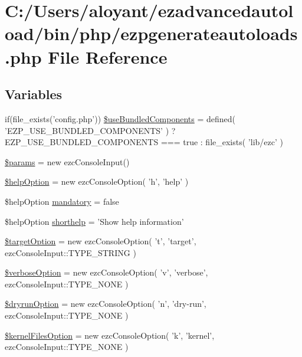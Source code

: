 \hypertarget{ezpgenerateautoloads_8php}{\section{C\-:/\-Users/aloyant/ezadvancedautoload/bin/php/ezpgenerateautoloads.php File Reference}
\label{ezpgenerateautoloads_8php}
}
\subsection*{Variables}
\begin{DoxyCompactItemize}
\item 
if(file\-\_\-exists('config.\-php')) \hyperlink{ezpgenerateautoloads_8php_abdb1c04b56bd870d8c95d438c1a3ceb7}{\$use\-Bundled\-Components} = defined( 'E\-Z\-P\-\_\-\-U\-S\-E\-\_\-\-B\-U\-N\-D\-L\-E\-D\-\_\-\-C\-O\-M\-P\-O\-N\-E\-N\-T\-S' ) ? E\-Z\-P\-\_\-\-U\-S\-E\-\_\-\-B\-U\-N\-D\-L\-E\-D\-\_\-\-C\-O\-M\-P\-O\-N\-E\-N\-T\-S === true \-: file\-\_\-exists( 'lib/ezc' )
\item 
\hyperlink{ezpgenerateautoloads_8php_afe68e6fbe7acfbffc0af0c84a1996466}{\$params} = new ezc\-Console\-Input()
\item 
\hyperlink{ezpgenerateautoloads_8php_a785ce4531ef75b21040c99c8cbce7aa4}{\$help\-Option} = new ezc\-Console\-Option( 'h', 'help' )
\item 
\$help\-Option \hyperlink{ezpgenerateautoloads_8php_ac38115d855b4d48735ec865ab62bf1fe}{mandatory} = false
\item 
\$help\-Option \hyperlink{ezpgenerateautoloads_8php_a6878132bff242d248a03a92df0ead036}{shorthelp} = 'Show help information'
\item 
\hyperlink{ezpgenerateautoloads_8php_a6b7b596c6eccab7f3c39bbcad2d711a0}{\$target\-Option} = new ezc\-Console\-Option( 't', 'target', ezc\-Console\-Input\-::\-T\-Y\-P\-E\-\_\-\-S\-T\-R\-I\-N\-G )
\item 
\hyperlink{ezpgenerateautoloads_8php_a22133d0c8998aa2d18623686cca5faa4}{\$verbose\-Option} = new ezc\-Console\-Option( 'v', 'verbose', ezc\-Console\-Input\-::\-T\-Y\-P\-E\-\_\-\-N\-O\-N\-E )
\item 
\hyperlink{ezpgenerateautoloads_8php_a2157a552be64e9a75918a23fef9e26e7}{\$dryrun\-Option} = new ezc\-Console\-Option( 'n', 'dry-\/run', ezc\-Console\-Input\-::\-T\-Y\-P\-E\-\_\-\-N\-O\-N\-E )
\item 
\hyperlink{ezpgenerateautoloads_8php_a7e74e8adf0bd544754962f4ddd4fc35b}{\$kernel\-Files\-Option} = new ezc\-Console\-Option( 'k', 'kernel', ezc\-Console\-Input\-::\-T\-Y\-P\-E\-\_\-\-N\-O\-N\-E )

\end{DoxyCompactItemize}
